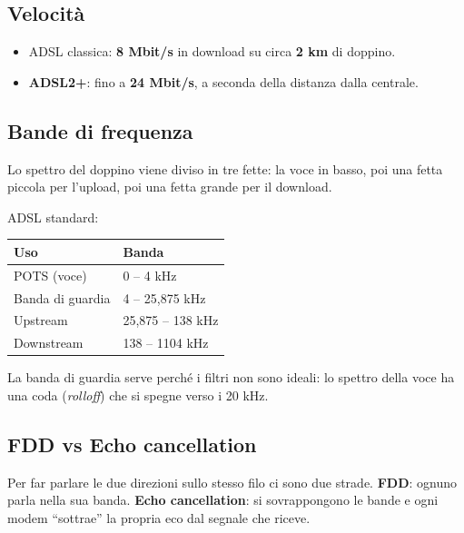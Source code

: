 \subsection{Velocità}

\begin{itemize}
\tightlist
\item
  ADSL classica: \textbf{8 Mbit/s} in download su circa \textbf{2 km} di doppino.
\item
  \textbf{ADSL2+}: fino a \textbf{24 Mbit/s}, a seconda della distanza dalla centrale.
\end{itemize}

\subsection{Bande di frequenza}

\begin{inbreve}

Lo spettro del doppino viene diviso in tre fette: la voce in basso, poi una fetta piccola per l'upload, poi una fetta grande per il download.

\end{inbreve}

ADSL standard:

\begin{longtable}[]{@{}ll@{}}
\toprule\noalign{}
Uso & Banda \\
\midrule\noalign{}
\endhead
\bottomrule\noalign{}
\endlastfoot
POTS (voce) & 0 -- 4 kHz \\
Banda di guardia & 4 -- 25,875 kHz \\
Upstream & 25,875 -- 138 kHz \\
Downstream & 138 -- 1104 kHz \\
\end{longtable}

La banda di guardia serve perché i filtri non sono ideali: lo spettro della voce ha una coda (\emph{rolloff}) che si spegne verso i 20 kHz.

\subsection{FDD vs Echo cancellation}

\begin{inbreve}

Per far parlare le due direzioni sullo stesso filo ci sono due strade. \textbf{FDD}: ognuno parla nella sua banda. \textbf{Echo cancellation}: si sovrappongono le bande e ogni modem ``sottrae'' la propria eco dal segnale che riceve.

\end{inbreve}

